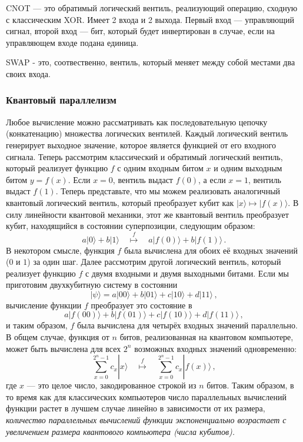 \documentclass[a4paper,14pt]{extreport} %
\newcommand{\ket}[1]{|#1\rangle}
\begin{document}
CNOT — это обратимый логический вентиль, реализующий операцию, сходную с классическим XOR. Имеет 2 входа и 2 выхода. Первый вход — управляющий сигнал, второй вход — бит, который будет инвертирован в случае, если на управляющем входе подана единица.

SWAP - это, соотвественно, вентиль, который меняет между собой местами два своих входа.
\subsubsection{Квантовый параллелизм}
Любое вычисление можно рассматривать как последовательную цепочку (конкатенацию) множества логических вентилей. Каждый логический вентиль генерирует выходное значение, которое является функцией от его входного сигнала. Теперь рассмотрим классический и обратимый логический вентиль, который реализует функцию $f$ с одним входным битом $x$ и одним выходным битом $y=f(x)$. Если $x=0$, вентиль выдаст $f(0)$, а если $x=1$, вентиль выдаст $f(1)$. Теперь представьте, что мы можем реализовать аналогичный квантовый логический вентиль, который преобразует кубит как $\ket{x} \mapsto
\ket{f(x)}$. В силу линейности квантовой механики, этот же квантовый вентиль преобразует кубит, находящийся в состоянии суперпозиции, следующим образом:
%
\begin{equation}
a \ket{0} + b \ket{1} \quad \stackrel{f}{\mapsto} \quad
 a \ket{f(0)} + b \ket{f(1)} \,.
\label{eq:1qubit_out}
\end{equation}
%
В некотором смысле, функция $f$ была вычислена для обоих её входных значений ($0$ и $1$) за один шаг. Далее рассмотрим другой логический вентиль, который реализует функцию $f$ с двумя входными и двумя выходными битами. Если мы приготовим двухкубитную систему в состоянии
%
\begin{equation}
\ket{\psi} = a \ket{00} + b \ket{01} + c \ket{10} + d \ket{11} \,,
\label{eq:2qubits_in}
\end{equation}
%
вычисление функции $f$ преобразует это состояние в
%
\begin{equation}
a \ket{f(00)} + b \ket{f(01)} + c \ket{f(10)} + d \ket{f(11)} \,,
\label{eq:2qubits_out}
\end{equation}
%
и таким образом, $f$ была вычислена для четырёх входных значений параллельно. В общем случае, функция от $n$ битов, реализованная на квантовом компьютере, может быть вычислена для всех $2^n$ возможных входных значений одновременно:
%
\begin{equation}
\sum_{x=0}^{2^n-1} c_x \ket{x} \quad \stackrel{f}{\mapsto} \quad
\sum_{x=0}^{2^n-1} c_x \ket{f(x)} \,,
\label{eq:nqubits_out}
\end{equation}
%
где $x$ — это целое число, закодированное строкой из $n$ битов. Таким образом, в то время как для классических компьютеров число параллельных вычислений функции растет в лучшем случае линейно в зависимости от их размера,
{\em количество параллельных вычислений функции экспоненциально возрастает с увеличением размера квантового компьютера (числа кубитов).}
\end{document}
